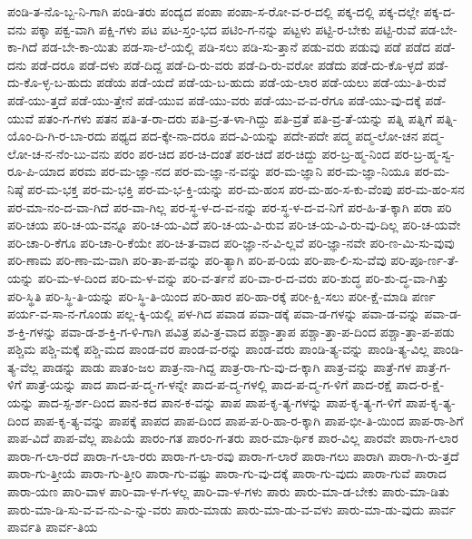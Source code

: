 {ಪಂಡಿ-ತ-ನೊ-ಬ್ಬ-ನಿ-ಗಾಗಿ
ಪಂಡಿ-ತರು
ಪಂದ್ಯದ
ಪಂಪಾ
ಪಂಪಾ-ಸ-ರೋ-ವ-ರ-ದಲ್ಲಿ
ಪಕ್ಕ-ದಲ್ಲಿ
ಪಕ್ಕ-ದಲ್ಲೇ
ಪಕ್ಕ-ದ-ವನು
ಪಕ್ಕಾ
ಪಕ್ವ-ವಾಗಿ
ಪಕ್ಷಿ-ಗಳು
ಪಟ
ಪಟ-ಸ್ತಂ-ಭದ
ಪಟಿಂ-ಗ-ನನ್ನು
ಪಟ್ಟಳು
ಪಟ್ಟಿ-ರ-ಬೇಕು
ಪಟ್ಟಿ-ರುವೆ
ಪಡ-ಬೇ-ಕಾ-ಗಿದೆ
ಪಡ-ಬೇ-ಕಾ-ಯಿತು
ಪಡ-ಸಾ-ಲೆ-ಯಲ್ಲಿ
ಪಡಿ-ಸಲು
ಪಡಿ-ಸು-ತ್ತಾನೆ
ಪಡು-ವರು
ಪಡುವು
ಪಡೆ
ಪಡೆದ
ಪಡೆ-ದನು
ಪಡೆ-ದರೂ
ಪಡೆ-ದಳು
ಪಡೆ-ದಿದ್ದ
ಪಡೆ-ದಿ-ರು-ವರು
ಪಡೆ-ದಿ-ರು-ವರೋ
ಪಡೆದು
ಪಡೆ-ದು-ಕೊ-ಳ್ಳದೆ
ಪಡೆ-ದು-ಕೊ-ಳ್ಳ-ಬ-ಹುದು
ಪಡೆಯ
ಪಡೆ-ಯದೆ
ಪಡೆ-ಯ-ಬ-ಹುದು
ಪಡೆ-ಯ-ಲಾರ
ಪಡೆ-ಯಲು
ಪಡೆ-ಯು-ತಿ-ರುವೆ
ಪಡೆ-ಯು-ತ್ತದೆ
ಪಡೆ-ಯು-ತ್ತೇನೆ
ಪಡೆ-ಯುವ
ಪಡೆ-ಯು-ವರು
ಪಡೆ-ಯು-ವ-ವ-ರೆಗೂ
ಪಡೆ-ಯು-ವು-ದಕ್ಕೆ
ಪಡೆ-ಯುವೆ
ಪತಂ-ಗ-ಗಳು
ಪತನ
ಪತಿ-ತ-ರಾ-ದರು
ಪತಿ-ವ್ರ-ತ-ಳಾ-ಗಿದ್ದು
ಪತಿ-ವ್ರತೆ
ಪತಿ-ವ್ರ-ತೆ-ಯನ್ನು
ಪತ್ನಿ
ಪತ್ನಿಗೆ
ಪತ್ನಿ-ಯೊಂ-ದಿ-ಗಿ-ರ-ಬಾ-ರದು
ಪಥ್ಯದ
ಪದ-ಕ್ಕೇ-ನಾ-ದರೂ
ಪದ-ವಿ-ಯನ್ನು
ಪದೇ-ಪದೇ
ಪದ್ಮ
ಪದ್ಮ-ಲೋ-ಚನ
ಪದ್ಮ-ಲೋ-ಚ-ನ-ನೆಂ-ಬು-ವನು
ಪರಂ
ಪರ-ಚಿದ
ಪರ-ಚಿ-ದಂತೆ
ಪರ-ಚಿದೆ
ಪರ-ಚಿದ್ದು
ಪರ-ಬ್ರ-ಹ್ಮ-ನಿಂದ
ಪರ-ಬ್ರ-ಹ್ಮ-ಸ್ವ-ರೂ-ಪಿ-ಯಾದ
ಪರಮ
ಪರ-ಮ-ಜ್ಞಾ-ನದ
ಪರ-ಮ-ಜ್ಞಾ-ನ-ವನ್ನು
ಪರ-ಮ-ಜ್ಞಾನಿ
ಪರ-ಮ-ಜ್ಞಾ-ನಿಯೂ
ಪರ-ಮ-ನಿಷ್ಠೆ
ಪರ-ಮ-ಭಕ್ತ
ಪರ-ಮ-ಭಕ್ತಿ
ಪರ-ಮ-ಭ-ಕ್ತಿ-ಯನ್ನು
ಪರ-ಮ-ಹಂಸ
ಪರ-ಮ-ಹಂ-ಸ-ಕು-ವೆಂಪು
ಪರ-ಮ-ಹಂ-ಸನ
ಪರ-ಮಾ-ನಂ-ದ-ವಾ-ಗಿದೆ
ಪರ-ವಾ-ಗಿಲ್ಲ
ಪರ-ಸ್ಥ-ಳ-ದ-ವ-ನನ್ನು
ಪರ-ಸ್ಥ-ಳ-ದ-ವ-ನಿಗೆ
ಪರ-ಹಿ-ತ-ಕ್ಕಾಗಿ
ಪರಾ
ಪರಿ
ಪರಿ-ಚಯ
ಪರಿ-ಚ-ಯ-ವನ್ನೂ
ಪರಿ-ಚ-ಯ-ವಿದೆ
ಪರಿ-ಚ-ಯ-ವಿ-ರುವ
ಪರಿ-ಚ-ಯ-ವಿ-ರು-ವು-ದಿಲ್ಲ
ಪರಿ-ಚ-ಯವೇ
ಪರಿ-ಚಾ-ರಿ-ಕೆಗೂ
ಪರಿ-ಚಾ-ರಿ-ಕೆಯೇ
ಪರಿ-ಚಿ-ತ-ವಾದ
ಪರಿ-ಜ್ಞಾ-ನ-ವಿ-ಲ್ಲವೆ
ಪರಿ-ಜ್ಞಾ-ನವೇ
ಪರಿ-ಣ-ಮಿ-ಸು-ವುವು
ಪರಿ-ಣಾಮ
ಪರಿ-ಣಾ-ಮ-ವಾಗಿ
ಪರಿ-ತಾ-ಪ-ವನ್ನು
ಪರಿ-ತ್ಯಾಗಿ
ಪರಿ-ಪ-ರಿಯ
ಪರಿ-ಪಾ-ಲಿ-ಸು-ವೆವು
ಪರಿ-ಪೂ-ರ್ಣ-ತೆ-ಯನ್ನು
ಪರಿ-ಮ-ಳ-ದಿಂದ
ಪರಿ-ಮ-ಳ-ವನ್ನು
ಪರಿ-ವ-ರ್ತನೆ
ಪರಿ-ವಾ-ರ-ದ-ವರು
ಪರಿ-ಶುದ್ಧ
ಪರಿ-ಶು-ದ್ಧ-ವಾ-ಗಿತ್ತು
ಪರಿ-ಸ್ಥಿತಿ
ಪರಿ-ಸ್ಥಿ-ತಿ-ಯನ್ನು
ಪರಿ-ಸ್ಥಿ-ತಿ-ಯಿಂದ
ಪರಿ-ಹಾರ
ಪರಿ-ಹಾ-ರಕ್ಕೆ
ಪರೀ-ಕ್ಷಿ-ಸಲು
ಪರೀ-ಕ್ಷೆ-ಮಾಡಿ
ಪರ್ಣ
ಪರ್ಯ-ವ-ಸಾ-ನ-ಗೊಂಡು
ಪಲ್ಲ-ಕ್ಕಿ-ಯಲ್ಲಿ
ಪಳ-ಗಿದ
ಪವಾಡ
ಪವಾ-ಡಕ್ಕೆ
ಪವಾ-ಡ-ಗಳನ್ನು
ಪವಾ-ಡ-ವನ್ನು
ಪವಾ-ಡ-ಶ-ಕ್ತಿ-ಗಳನ್ನು
ಪವಾ-ಡ-ಶ-ಕ್ತಿ-ಗ-ಳಿ-ಗಾಗಿ
ಪವಿತ್ರ
ಪವಿ-ತ್ರ-ವಾದ
ಪಶ್ಚಾ-ತ್ತಾಪ
ಪಶ್ಚಾ-ತ್ತಾ-ಪ-ದಿಂದ
ಪಶ್ಚಾ-ತ್ತಾ-ಪ-ಪಡು
ಪಶ್ಚಿಮ
ಪಶ್ಚಿ-ಮಕ್ಕೆ
ಪಶ್ಚಿ-ಮದ
ಪಾಂಡ-ವರ
ಪಾಂಡ-ವ-ರನ್ನು
ಪಾಂಡ-ವರು
ಪಾಂಡಿ-ತ್ಯ-ವನ್ನು
ಪಾಂಡಿ-ತ್ಯ-ವಿಲ್ಲ
ಪಾಂಡಿ-ತ್ಯ-ವೆಲ್ಲ
ಪಾಡನ್ನು
ಪಾಡು
ಪಾತಂ-ಜಲ
ಪಾತ್ರ-ನಾ-ಗಿದ್ದ
ಪಾತ್ರ-ರಾ-ಗು-ವು-ದ-ಕ್ಕಾಗಿ
ಪಾತ್ರ-ವನ್ನು
ಪಾತ್ರೆ-ಗಳ
ಪಾತ್ರೆ-ಗ-ಳಿಗೆ
ಪಾತ್ರೆ-ಯನ್ನು
ಪಾದ
ಪಾದ-ಪ-ದ್ಮ-ಗ-ಳನ್ನೇ
ಪಾದ-ಪ-ದ್ಮ-ಗಳಲ್ಲಿ
ಪಾದ-ಪ-ದ್ಮ-ಗ-ಳಿಗೆ
ಪಾದ-ರಕ್ಷೆ
ಪಾದ-ರ-ಕ್ಷೆ-ಯನ್ನು
ಪಾದ-ಸ್ಪ-ರ್ಶ-ದಿಂದ
ಪಾನ-ಕದ
ಪಾನ-ಕ-ವನ್ನು
ಪಾಪ
ಪಾಪ-ಕೃ-ತ್ಯ-ಗಳನ್ನು
ಪಾಪ-ಕೃ-ತ್ಯ-ಗ-ಳಿಗೆ
ಪಾಪ-ಕೃ-ತ್ಯ-ದಿಂದ
ಪಾಪ-ಕೃ-ತ್ಯ-ವನ್ನು
ಪಾಪಕ್ಕೆ
ಪಾಪದ
ಪಾಪ-ದಿಂದ
ಪಾಪ-ಪ-ರಿ-ಹಾ-ರ-ಕ್ಕಾಗಿ
ಪಾಪ-ಭೀ-ತಿ-ಯಿಂದ
ಪಾಪ-ರಾ-ಶಿಗೆ
ಪಾಪ-ವಿದೆ
ಪಾಪ-ವೆಲ್ಲ
ಪಾಪಿಯೆ
ಪಾರಂ-ಗತ
ಪಾರಂ-ಗ-ತರು
ಪಾರ-ಮಾ-ರ್ಥಿಕ
ಪಾರ-ವಿಲ್ಲ
ಪಾರವೇ
ಪಾರಾ-ಗ-ಲಾರ
ಪಾರಾ-ಗ-ಲಾ-ರದೆ
ಪಾರಾ-ಗ-ಲಾ-ರರು
ಪಾರಾ-ಗ-ಲಾ-ರವು
ಪಾರಾ-ಗ-ಲಾರೆ
ಪಾರಾ-ಗಲು
ಪಾರಾಗಿ
ಪಾರಾ-ಗಿ-ರು-ತ್ತದೆ
ಪಾರಾ-ಗು-ತ್ತೀಯೆ
ಪಾರಾ-ಗು-ತ್ತೀರಿ
ಪಾರಾ-ಗು-ವಷ್ಟು
ಪಾರಾ-ಗು-ವು-ದಕ್ಕೆ
ಪಾರಾ-ಗು-ವುದು
ಪಾರಾ-ಗುವೆ
ಪಾರಾದ
ಪಾರಾ-ಯಣ
ಪಾರಿ-ವಾಳ
ಪಾರಿ-ವಾ-ಳ-ಗ-ಳಲ್ಲ
ಪಾರಿ-ವಾ-ಳ-ಗಳು
ಪಾರು
ಪಾರು-ಮಾ-ಡ-ಬೇಕು
ಪಾರು-ಮಾ-ಡಿತು
ಪಾರು-ಮಾ-ಡಿ-ಸು-ವ-ವ-ನು-ಎ-ನ್ನು-ವರು
ಪಾರು-ಮಾಡು
ಪಾರು-ಮಾ-ಡು-ವ-ವಳು
ಪಾರು-ಮಾ-ಡು-ವುದು
ಪಾರ್ವ
ಪಾರ್ವತಿ
ಪಾರ್ವ-ತಿಯ
}
